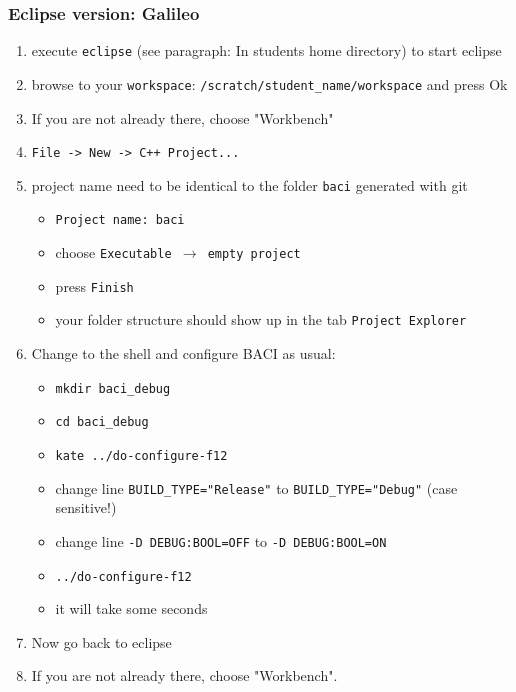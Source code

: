\subsubsection{Eclipse version: Galileo}

\begin{enumerate}
\item execute \texttt{eclipse} (see paragraph: In students home directory) to start eclipse

\item browse to your \texttt{workspace}: \texttt{/scratch/student\_name/workspace} and press Ok

\item If you are not already there, choose "Workbench"

\item \texttt{File -> New -> C++ Project...}

\item project name need to be identical to the folder \texttt{baci} generated with git
\begin{itemize}
  \item \texttt{Project name: baci} 
  \item choose \texttt{Executable $\rightarrow$ empty project} 
  \item press \texttt{Finish}
  \item your folder structure should show up in the tab \texttt{Project Explorer} 
\end{itemize}

\item Change to the shell and configure BACI as usual:
\begin{itemize}
  \item \texttt{mkdir baci\_debug}
  \item \texttt{cd baci\_debug}
  \item \texttt{kate ../do-configure-f12}
  \item change line \texttt{BUILD\_TYPE="Release"} to \texttt{BUILD\_TYPE="Debug"} (case sensitive!)
  \item change line \texttt{-D DEBUG:BOOL=OFF} to \texttt{-D DEBUG:BOOL=ON}
  \item \texttt{../do-configure-f12}
  \item it will take some seconds
\end{itemize}

\item Now go back to eclipse

\item If you are not already there, choose "Workbench".


\end{enumerate}
